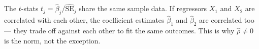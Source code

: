 \begin{remark}
The $t$-stats $t_j = \hat\beta_j / \widehat{\mathrm{SE}}_j$ share the same sample data. If regressors $X_1$ and $X_2$ are correlated with each other, the coefficient estimates $\hat\beta_1$ and $\hat\beta_2$ are correlated too — they trade off against each other to fit the same outcomes. This is why $\hat\rho \neq 0$ is the norm, not the exception.
\end{remark}
